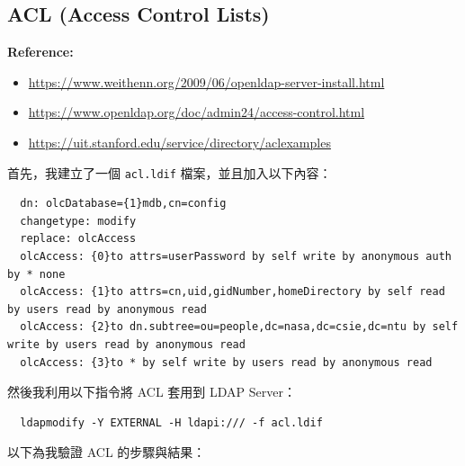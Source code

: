 \documentclass[12pt]{article}
\newenvironment{mycolorbox}[1][gray]{
  \renewmdenv[
    linewidth=2pt, linecolor=#1, backgroundcolor=#1!10,
    topline=false, bottomline=false, rightline=false,
    skipabove=10pt, skipbelow=10pt, innerleftmargin=10pt,
    innerrightmargin=0pt, innertopmargin=5pt, innerbottommargin=5pt
  ]{myquote}
  \begin{myquote}
}{\end{myquote}}
\begin{document}
\subsection{ACL (Access Control Lists)}
\begin{mycolorbox}[teal]
  \textbf{Reference:}
  \footnotesize
  \begin{itemize}
    \item \url{https://www.weithenn.org/2009/06/openldap-server-install.html}
    \item \url{https://www.openldap.org/doc/admin24/access-control.html}
    \item \url{https://uit.stanford.edu/service/directory/aclexamples}
  \end{itemize}
\end{mycolorbox}
首先，我建立了一個 \texttt{acl.ldif} 檔案，並且加入以下內容：
\begin{verbatim}
  dn: olcDatabase={1}mdb,cn=config
  changetype: modify
  replace: olcAccess
  olcAccess: {0}to attrs=userPassword by self write by anonymous auth by * none
  olcAccess: {1}to attrs=cn,uid,gidNumber,homeDirectory by self read by users read by anonymous read
  olcAccess: {2}to dn.subtree=ou=people,dc=nasa,dc=csie,dc=ntu by self write by users read by anonymous read
  olcAccess: {3}to * by self write by users read by anonymous read
\end{verbatim}
然後我利用以下指令將 ACL 套用到 LDAP Server：
\begin{verbatim}
  ldapmodify -Y EXTERNAL -H ldapi:/// -f acl.ldif
\end{verbatim}
以下為我驗證 ACL 的步驟與結果：
\end{document}
